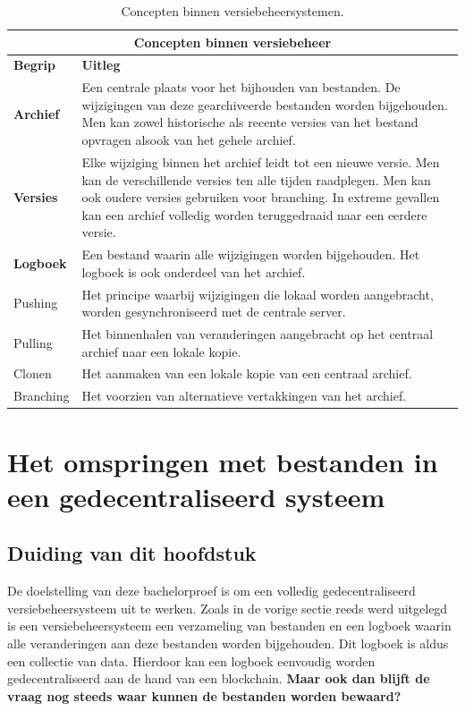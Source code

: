 \begin{table}[h!]
	\centering
	\begin{tabular}{ |p{2cm}|p{12cm}|}
 		\hline
 		\multicolumn{2}{|c|}{\large \textbf{Concepten binnen versiebeheer}} \\
 		\hline
 		\textbf{Begrip}	& \textbf{Uitleg}\\
 		\hline
 		\textbf{Archief} & Een centrale plaats voor het bijhouden van bestanden. De wijzigingen van deze gearchiveerde bestanden worden bijgehouden. Men kan zowel historische als recente versies van het bestand opvragen alsook van het gehele archief.\\
 		\hline
 		\textbf{Versies} & Elke wijziging binnen het archief leidt tot een nieuwe versie. Men kan de verschillende versies ten alle tijden raadplegen. Men kan ook oudere versies gebruiken voor branching. In extreme gevallen kan een archief volledig worden teruggedraaid naar een eerdere versie.\\
 		\hline
		\textbf{Logboek} & Een bestand waarin alle wijzigingen worden bijgehouden. Het logboek is ook onderdeel van het archief. \\
		\hline
		Pushing	& Het principe waarbij wijzigingen die lokaal worden aangebracht, worden gesynchroniseerd met de centrale server.\\
		\hline
		Pulling & Het binnenhalen van veranderingen aangebracht op het centraal archief naar een lokale kopie.\\
		\hline
		Clonen & Het aanmaken van een lokale kopie van een centraal archief. \\
		Branching & Het voorzien van alternatieve vertakkingen van het archief. \\
		\hline
	\end{tabular}
	\label{tbl_concepts}
	\caption{Concepten binnen versiebeheersystemen.}
\end{table}
\newpage
\section{Het omspringen met bestanden in een gedecentraliseerd systeem}
\label{IPFS}
\subsection{Duiding van dit hoofdstuk}
\label{Duiding_IPFS}
De doelstelling van deze bachelorproef is om een volledig gedecentraliseerd versiebeheersysteem uit te werken. Zoals in de vorige sectie reeds werd uitgelegd is een versiebeheersysteem een verzameling van bestanden en een logboek waarin alle veranderingen aan deze bestanden worden bijgehouden. Dit logboek is aldus een collectie van data. Hierdoor kan een logboek eenvoudig worden gedecentraliseerd aan de hand van een blockchain. \textbf{Maar ook dan blijft de vraag nog steeds waar kunnen de bestanden worden bewaard?}\\

